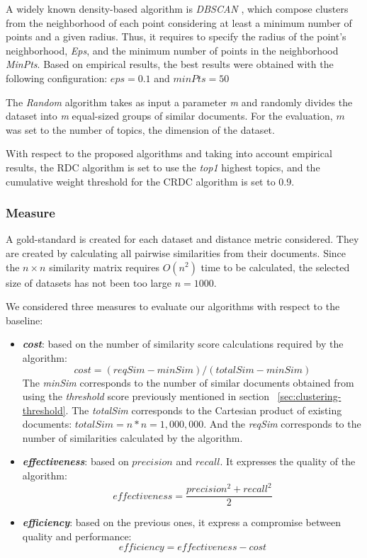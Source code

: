 A widely known density-based algorithm is \textit{DBSCAN} \citep{Ester1996}, which compose clusters from the neighborhood of each point considering at least a minimum number of points and a given radius. Thus, it requires to specify the radius of the point's neighborhood, \textit{Eps}, and the minimum number of points in the neighborhood \textit{MinPts}. Based on empirical results, the best results were obtained with the following configuration: $eps=0.1$ and $minPts=50$

The \textit{Random} algorithm takes as input a parameter \textit{m} and randomly divides the dataset into \textit{m} equal-sized groups of similar documents. For the evaluation, $m$ was set to the number of topics, the dimension of the dataset.

With respect to the proposed algorithms and taking into account empirical results, the RDC algorithm is set to use the \textit{top1} highest topics, and the cumulative weight threshold for the CRDC algorithm is set to $0.9$.

\subsubsection{Measure}

A gold-standard is created for each dataset and distance metric considered. They are created by calculating all pairwise similarities from their documents. Since the $n \times n$ similarity matrix requires $O(n^2)$ time to be calculated, the selected size of datasets has not been too large $n=1000$.

We considered three measures to evaluate our algorithms with respect to the baseline:
\begin{itemize}
  \item \textbf{\textit{cost}}: based on the number of similarity score calculations required by the algorithm:
\begin{equation}
cost=(reqSim - minSim)/(totalSim - minSim)
\end{equation}
The \textit{minSim} corresponds to the number of similar documents obtained from using the \textit{threshold} score previously mentioned in section ~\ref{sec:clustering-threshold}. The \textit{totalSim} corresponds to the Cartesian product of existing documents: $totalSim=n*n=1,000,000$. And the \textit{reqSim} corresponds to the number of similarities calculated by the algorithm.
  \item \textbf{\textit{effectiveness}}: based on $precision$ and $recall$. It expresses the quality of the algorithm:
\begin{equation}
 effectiveness = \frac{precision^2  + recall^2}{2}
\end{equation}
  \item \textbf{\textit{efficiency}}: based on the previous ones, it express a compromise between quality and performance:
\begin{equation}
 efficiency = effectiveness - cost
\end{equation}
\end{itemize}

